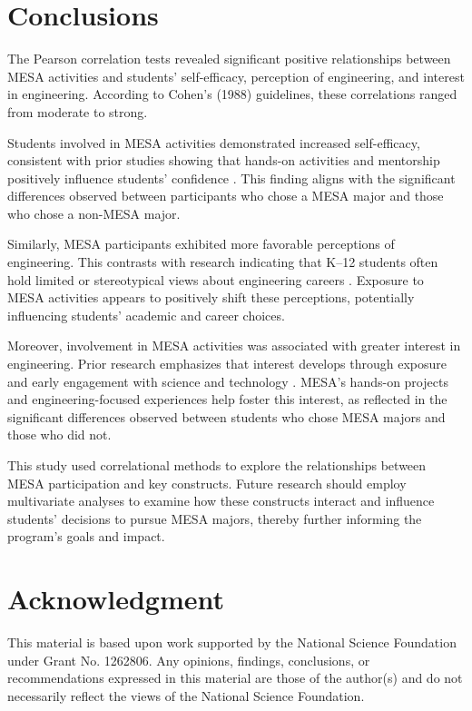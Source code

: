 \documentclass[11pt]{article}
\begin{document}
\section{Conclusions}

The Pearson correlation tests revealed significant positive relationships between MESA activities and students’ self-efficacy, perception of engineering, and interest in engineering. According to Cohen’s (1988) guidelines, these correlations ranged from moderate to strong.

Students involved in MESA activities demonstrated increased self-efficacy, consistent with prior studies showing that hands-on activities and mentorship positively influence students’ confidence \citep{denson2010, gaffney2013, wheeler2014}. This finding aligns with the significant differences observed between participants who chose a MESA major and those who chose a non-MESA major.

Similarly, MESA participants exhibited more favorable perceptions of engineering. This contrasts with research indicating that K–12 students often hold limited or stereotypical views about engineering careers \citep{fralick2009, korpershoek2013, marshall2007}. Exposure to MESA activities appears to positively shift these perceptions, potentially influencing students’ academic and career choices.

Moreover, involvement in MESA activities was associated with greater interest in engineering. Prior research emphasizes that interest develops through exposure and early engagement with science and technology \citep{beggs2008, ewen2013}. MESA’s hands-on projects and engineering-focused experiences help foster this interest, as reflected in the significant differences observed between students who chose MESA majors and those who did not.

This study used correlational methods to explore the relationships between MESA participation and key constructs. Future research should employ multivariate analyses to examine how these constructs interact and influence students’ decisions to pursue MESA majors, thereby further informing the program’s goals and impact.

\section*{Acknowledgment}

This material is based upon work supported by the National Science Foundation under Grant No. 1262806. Any opinions, findings, conclusions, or recommendations expressed in this material are those of the author(s) and do not necessarily reflect the views of the National Science Foundation.
\end{document}
